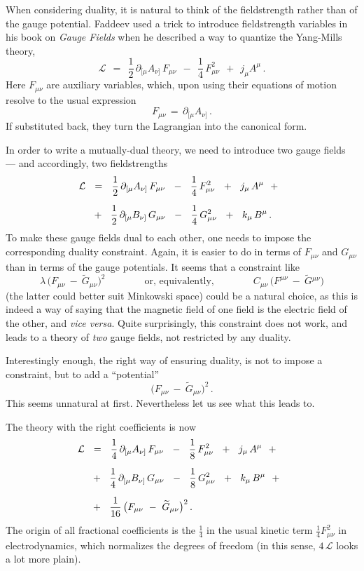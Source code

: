 \documentclass[epsfig,12pt]{article}
\def\beq{\begin{equation}}
\def\eeq{\end{equation}}
\newcommand{\cell}{{\mathcal L}}
\newcommand{\p}{\partial}
\newcommand{\wt}{\widetilde}
\begin{document}
	When considering duality, it is natural to think of the fieldstrength rather than of the gauge potential.
	Faddeev used a trick to introduce fieldstrength variables in his book on {\it Gauge Fields} when he
	described a way to quantize the Yang-Mills theory, 
\beq
	\cell    ~~=~~    \frac{1}{2}\, \p_{[\mu} A_{\nu]}\, F_{\mu\nu}  ~~-~~  \frac{1}{4}\, F_{\mu\nu}^2  ~~+~~ j_\mu A^\mu\,.
\eeq
	Here $ F_{\mu\nu} $ are auxiliary variables, which, upon using their equations of motion resolve to
	the usual expression 
\[
	F_{\mu\nu} \,=\, \p_{[\mu}A_{\nu]}\,.
\]
	If substituted back, they turn the Lagrangian into the canonical form.
	
	In order to write a mutually-dual theory, we need to introduce two gauge fields --- and accordingly, two fieldstrengths
\begin{align}
%
\notag
	\cell    & ~~=~~    \frac{1}{2}\, \p_{[\mu} A_{\nu]}\, F_{\mu\nu}  ~~-~~  \frac{1}{4}\, F_{\mu\nu}^2  ~~+~~ j_\mu\, A^\mu  ~~+~~
	\\[2mm]
%
	&
		   ~~+~~    \frac{1}{2}\, \p_{[\mu} B_{\nu]}\, G_{\mu\nu}  ~~-~~  \frac{1}{4}\, G_{\mu\nu}^2  ~~+~~ k_\mu\, B^\mu\,.
\end{align}
	To make these gauge fields dual to each other, one needs to impose the corresponding duality constraint.
	Again, it is easier to do in terms of $ F_{\mu\nu} $ and $ G_{\mu\nu} $ than in terms of the gauge potentials.
	It seems that a constraint like
\[
	\lambda\, \big( F_{\mu\nu} ~-~ \wt G{}_{\mu\nu} \big)^2
	\qquad\qquad \text{or, equivalently,} \qquad\qquad
	C_{\mu\nu}\, \big( F^{\mu\nu} ~-~ \wt G{}^{\mu\nu} \big)
\]
	(the latter could better suit Minkowski space) could be a natural choice,
	as this is indeed a way of saying that the magnetic field of one field is the electric field of the other,
	and {\it vice versa}.
	Quite surprisingly, this constraint does not work, and leads to a theory of {\it two} gauge fields, not restricted by any duality.

	Interestingly enough, the right way of ensuring duality, is not to impose a constraint, but to add a ``potential''
\[
	\big( F_{\mu\nu} ~-~ \wt G{}_{\mu\nu} \big)^2\,.
\]
	This seems unnatural at first.
	Nevertheless let us see what this leads to.

	The theory with the right coefficients is now
\begin{align}
%
\notag
	\cell    & ~~=~~    \frac{1}{4}\, \p_{[\mu} A_{\nu]}\, F_{\mu\nu}  ~~-~~  \frac{1}{8}\, F_{\mu\nu}^2  ~~+~~  j_\mu\, A^\mu  ~~+~~
	\\[2mm]
%
\label{action}
	&
		   ~~+~~    \frac{1}{4}\, \p_{[\mu} B_{\nu]}\, G_{\mu\nu}  ~~-~~  \frac{1}{8}\, G_{\mu\nu}^2  ~~+~~  k_\mu\, B^\mu  ~~+~~
	\\[2mm]
%
\notag
	&
	           ~~+~~    \frac{1}{16}\, \big( F_{\mu\nu} ~-~ \wt G{}_{\mu\nu} \big)^2\,.
\end{align}
	The origin of all fractional coefficients is the $ \frac{1}{4} $ in the usual kinetic term $ \frac{1}{4} F_{\mu\nu}^2 $ 
	in electrodynamics, which normalizes the degrees of freedom (in this sense, $ 4\, \cell $ looks a lot more plain).
\end{document}
